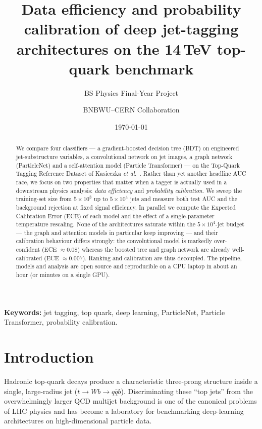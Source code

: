 \documentclass[11pt,a4paper]{article}
\title{\textbf{Data efficiency and probability calibration of deep
        jet-tagging architectures on the 14\,TeV top-quark benchmark}}
\author[1]{BS Physics Final-Year Project}
\author[1]{BNBWU--CERN Collaboration}
\affil[1]{Department of Physics, Begum Nusrat Bhutto Women University, Sukkur, Pakistan}
\date{\today}
\begin{document}
\maketitle

\begin{abstract}
We compare four classifiers --- a gradient-boosted decision tree
(BDT) on engineered jet-substructure variables, a convolutional
network on jet images, a graph network (ParticleNet) and a
self-attention model (Particle Transformer) --- on the Top-Quark
Tagging Reference Dataset of Kasieczka \emph{et al.}~\cite{topref}.
Rather than yet another headline AUC race, we focus on two
properties that matter when a tagger is actually used in a downstream
physics analysis: \emph{data efficiency} and \emph{probability
calibration}.  We sweep the training-set size from $5\!\times\!10^3$
up to $5\!\times\!10^4$ jets and measure both test AUC and the
background rejection at fixed signal efficiency.  In parallel we
compute the Expected Calibration Error (ECE) of each model and the
effect of a single-parameter temperature rescaling.  None of the
architectures saturate within the $5\times10^4$-jet budget --- the
graph and attention models in particular keep improving --- and their
calibration behaviour differs strongly: the convolutional model is
markedly over-confident (ECE $\approx0.08$) whereas the boosted tree
and graph network are already well-calibrated (ECE $\approx0.007$).
Ranking and calibration are thus decoupled.  The pipeline, models and
analysis are open source and reproducible on a CPU laptop in about an
hour (or minutes on a single GPU).
\end{abstract}

\noindent\textbf{Keywords:} jet tagging, top quark, deep learning,
ParticleNet, Particle Transformer, probability calibration.

\section{Introduction}\label{sec:intro}

Hadronic top-quark decays produce a characteristic three-prong
structure inside a single, large-radius jet
($t\!\rightarrow\!Wb\!\rightarrow\!q\bar{q}b$).  Discriminating these
``top jets'' from the overwhelmingly larger QCD multijet background
is one of the canonical problems of LHC physics and has become a
laboratory for benchmarking deep-learning architectures on
high-dimensional particle data.
\end{document}
